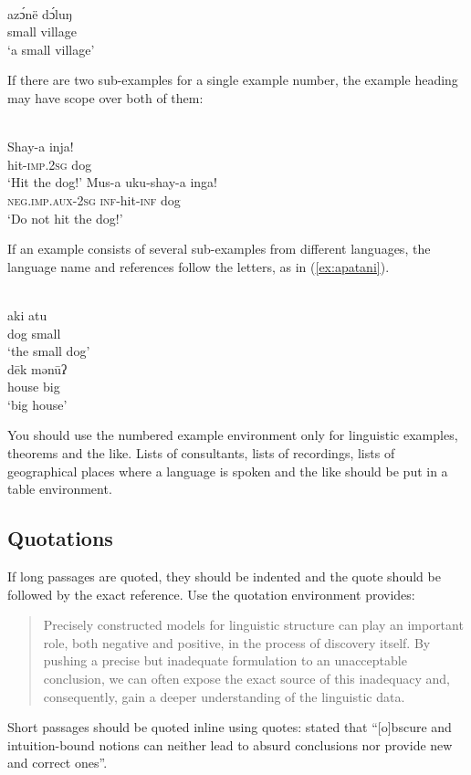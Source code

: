 {\def\exfont{\normalsize\itshape}
\ea\label{ex-typology}
\\
\gll azɔ́në dɔ́luŋ\\
     small village\\ 
\glt `a small village' 
\z


If there are two sub-examples for a single example number, the example heading may have scope over both of them:

\ea
{}\\
\ea
\gll Shay-a		inja!\\
hit-\textsc{imp.2sg}	dog\\
\glt `Hit the dog!'
\ex
\gll	Mus-a	uku-shay-a	inga! \\
	\textsc{neg.imp.aux-2sg}	\textsc{inf}-hit-\textsc{inf}	dog \\
\glt		`Do not hit the dog!'	
\z
\z

If an example consists of several sub-examples from different languages, the language name and references follow the letters, as in (\ref{ex:apatani}).

\ea\label{ex:apatani}
\ea
{}\\
\gll aki atu\\ 
     dog small\\ 
\glt ‘the small dog’ 
\ex 
{}\\ 
\gll dēk mənūʔ\\
     house big\\
\glt ‘big house’ 
\z
\z

You should use the numbered example environment only for linguistic examples, theorems and the like. Lists of consultants, lists of recordings, lists of geographical places where a language is spoken and the like should be put in a table environment. 


\subsection{Quotations}

If long passages are quoted, they should be indented and the quote should be followed by the exact reference. Use the quotation environment \latex provides:
\begin{quote}
Precisely constructed models for linguistic structure can play an
important role, both negative and positive, in the process of discovery 
itself. By pushing a precise but inadequate formulation to
an unacceptable conclusion, we can often expose the exact source
of this inadequacy and, consequently, gain a deeper understanding
of the linguistic data.
\citep[5]{Chomsky57a}
\end{quote}
%
Short passages should be quoted inline using quotes: \citet[5]{Chomsky57a} stated that ``[o]bscure
  and intuition-bound notions can neither lead to absurd conclusions nor provide new and
correct ones''.

}
